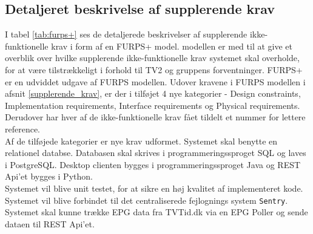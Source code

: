 \subsection{Detaljeret beskrivelse af supplerende krav}

 I tabel \ref{tab:furps+} ses de detaljerede beskrivelser af supplerende ikke-funktionelle krav i form af en FURPS+ model. modellen er med til at give et overblik over hvilke supplerende ikke-funktionelle krav systemet skal overholde, for at være tilstrækkeligt i forhold til TV2 og gruppens forventninger.
FURPS+ er en udviddet udgave af FURPS modellen. Udover kravene i FURPS modellen i afsnit \ref{supplerende_krav}, er der i tilføjet 4 nye kategorier - Design constraints, Implementation requirements, Interface requirements og Physical requirements. Derudover har hver af de ikke-funktionelle krav fået tildelt et nummer for lettere reference. \\
Af de tilføjede kategorier er nye krav udformet. Systemet skal benytte en relationel databse. Databasen skal skrives i programmeringssproget SQL og laves i PostgreSQL. Desktop clienten bygges i programmeringssproget Java og REST Api'et bygges i Python.\\
Systemet vil blive unit testet, for at sikre en høj kvalitet af implementeret kode. Systemet vil blive forbindet til det centraliserede fejlognings system \texttt{Sentry}.\\
Systemet skal kunne trække EPG data fra TVTid.dk via en EPG Poller og sende dataen til REST Api'et.

